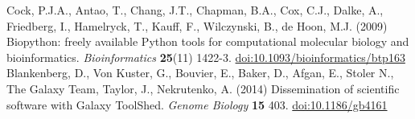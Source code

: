 \documentclass[10pt,oneside]{article}
\begin{document}
\begin{thebibliography}{}

Cock, P.J.A., Antao, T., Chang, J.T., Chapman, B.A., Cox, C.J., Dalke, A., Friedberg, I., Hamelryck, T., Kauff, F., Wilczynski, B., de Hoon, M.J. (2009) Biopython: freely available Python tools for computational molecular biology and bioinformatics. {\it Bioinformatics} {\bf 25}(11) 1422-3. \href{http://dx.doi.org/10.1093/bioinformatics/btp163}{doi:10.1093/bioinformatics/btp163}
Blankenberg, D., Von Kuster, G., Bouvier, E., Baker, D., Afgan, E., Stoler N., The Galaxy Team, Taylor, J., Nekrutenko, A. (2014) Dissemination of scientific software with Galaxy ToolShed. {\it Genome Biology} {\bf 15} 403. \href{http://dx.doi.org/10.1186/gb4161}{doi:10.1186/gb4161}

\end{thebibliography}
\end{document}
